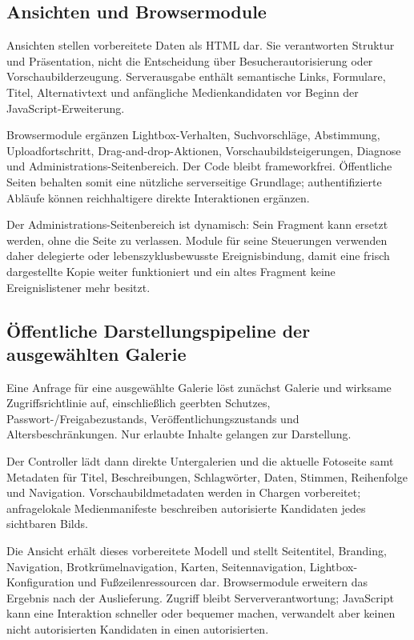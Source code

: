 \documentclass[11pt,a4paper]{article}
\begin{document}
\subsection{Ansichten und Browsermodule}

Ansichten stellen vorbereitete Daten als HTML dar. Sie verantworten Struktur und
Präsentation, nicht die Entscheidung über Besucherautorisierung oder
Vorschaubilderzeugung. Serverausgabe enthält semantische Links, Formulare,
Titel, Alternativtext und anfängliche Medienkandidaten vor Beginn der
JavaScript-Erweiterung.

Browsermodule ergänzen Lightbox-Verhalten, Suchvorschläge, Abstimmung,
Uploadfortschritt, Drag-and-drop-Aktionen, Vorschaubildsteigerungen, Diagnose
und Administrations-Seitenbereich. Der Code bleibt frameworkfrei. Öffentliche
Seiten behalten somit eine nützliche serverseitige Grundlage; authentifizierte
Abläufe können reichhaltigere direkte Interaktionen ergänzen.

Der Administrations-Seitenbereich ist dynamisch: Sein Fragment kann ersetzt
werden, ohne die Seite zu verlassen. Module für seine Steuerungen verwenden
daher delegierte oder lebenszyklusbewusste Ereignisbindung, damit eine frisch
dargestellte Kopie weiter funktioniert und ein altes Fragment keine
Ereignislistener mehr besitzt.

\subsection{Öffentliche Darstellungspipeline der ausgewählten Galerie}

Eine Anfrage für eine ausgewählte Galerie löst zunächst Galerie und wirksame
Zugriffsrichtlinie auf, einschließlich geerbten Schutzes,
Passwort-/Freigabezustands, Veröffentlichungszustands und Altersbeschränkungen.
Nur erlaubte Inhalte gelangen zur Darstellung.

Der Controller lädt dann direkte Untergalerien und die aktuelle Fotoseite samt
Metadaten für Titel, Beschreibungen, Schlagwörter, Daten, Stimmen, Reihenfolge
und Navigation. Vorschaubildmetadaten werden in Chargen vorbereitet;
anfragelokale Medienmanifeste beschreiben autorisierte Kandidaten jedes
sichtbaren Bilds.

Die Ansicht erhält dieses vorbereitete Modell und stellt Seitentitel, Branding,
Navigation, Brotkrümelnavigation, Karten, Seitennavigation,
Lightbox-Konfiguration und Fußzeilenressourcen dar. Browsermodule erweitern das
Ergebnis nach der Auslieferung. Zugriff bleibt Serververantwortung; JavaScript
kann eine Interaktion schneller oder bequemer machen, verwandelt aber keinen
nicht autorisierten Kandidaten in einen autorisierten.
\end{document}
